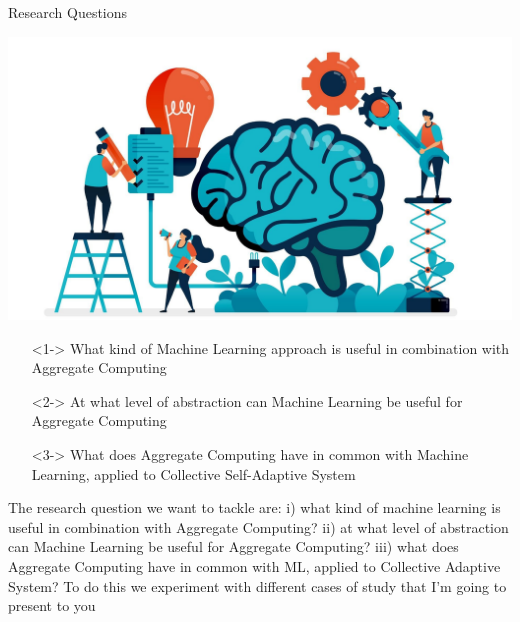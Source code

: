 
\begin{frame}{Research Questions}
  \begin{backgroundblock} 
    \includegraphics[width=\paperwidth]{img/background.jpg} 
  \end{backgroundblock} 
  \begin{card}
    \begin{itemize}
      \item[\faQuestion] <1-> What kind of Machine Learning approach is useful in combination with Aggregate Computing
      \item[\faQuestion] <2-> At what level of abstraction can Machine Learning be useful for Aggregate Computing
      \item[\faQuestion] <3-> What does Aggregate Computing have in common with Machine Learning, applied to Collective Self-Adaptive System
    \end{itemize}  
  \end{card}
  \pdfcomment 
  {
    The research question we want to tackle are: 
    i) what kind of machine learning is useful in combination with Aggregate Computing? 
    ii) at what level of abstraction can Machine Learning be useful for Aggregate Computing? 
    iii) what does Aggregate Computing have in common with ML, applied to Collective Adaptive System? 
    To do this we experiment with different cases of study that I'm going to present to you  
  }
\end{frame}